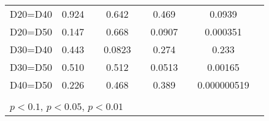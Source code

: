 \begin{tabular}{l|cccccc|cc}
D20=D40         &    0.924         &         &    0.642         &         &    0.469         &         &   0.0939         &         \\
D20=D50         &    0.147         &         &    0.668         &         &   0.0907         &         & 0.000351         &         \\
D30=D40         &    0.443         &         &   0.0823         &         &    0.274         &         &    0.233         &         \\
D30=D50         &    0.510         &         &    0.512         &         &   0.0513         &         &  0.00165         &         \\
D40=D50         &    0.226         &         &    0.468         &         &    0.389         &         &0.000000519         &         \\
\hline\hline
\multicolumn{9}{p{16cm}}{\tiny }\\
\multicolumn{9}{l}{\tiny \sym{*} \(p<0.1\), \sym{**} \(p<0.05\), \sym{***} \(p<0.01\)}\\
\end{tabular}